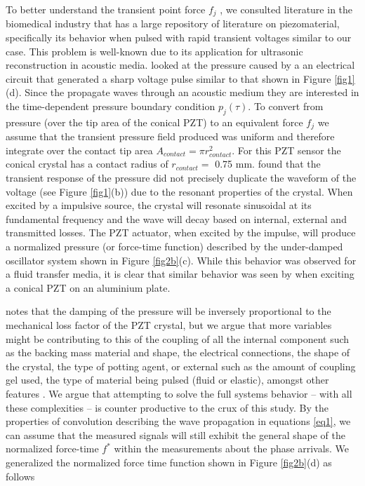 \documentclass[preprint,3p, 11pt,authoryear]{elsarticle}
\begin{document}
To better understand the transient point force $f_{j}$ , we consulted literature in the biomedical industry that has a large repository of literature on piezomaterial, specifically its behavior when pulsed with rapid transient voltages similar to our case. This problem is well-known due to its application for ultrasonic reconstruction in acoustic media.  \citet{Christensen1988} looked at the pressure caused by a an electrical circuit that generated a sharp voltage pulse similar to that shown in Figure \ref{fig1}(d). Since the propagate waves through an acoustic medium they are interested in the time-dependent pressure boundary condition $p_{j}(\tau)$. To convert from pressure (over the tip area of the conical PZT) to an equivalent force $f_{j}$ we assume that the transient pressure field produced was uniform and therefore integrate over the contact tip area $A_{contact} = \pi r_{contact}^{2}$. For this PZT sensor the conical crystal has a contact radius of $r_{contact} = $ 0.75 mm. \cite{Christensen1988} found that the transient response of the pressure did not precisely duplicate the waveform of the voltage (see Figure \ref{fig1}(b)) due to the resonant properties of the crystal. When excited by a impulsive source, the crystal will resonate sinusoidal at its fundamental frequency and the wave will decay based on internal, external and transmitted losses.  The PZT actuator, when excited by the impulse, will produce a normalized pressure (or force-time function) described by the under-damped oscillator system shown in Figure \ref{fig2b}(c). While this behavior was observed for a fluid transfer media, it is clear that similar behavior was seen by\citet{Breckenridge1990} when exciting a conical PZT on an aluminium plate.

\citet{Christensen1988} notes that the damping of the pressure will be inversely proportional to the mechanical loss factor of the PZT crystal, but we argue that more variables might be contributing to this of the coupling of all the internal component such as the backing mass material and shape, the electrical connections, the shape of the crystal, the type of potting agent, or external such as the amount of coupling gel used, the type of material being pulsed (fluid or elastic), amongst other features \citep{Glaser1998}.  We argue that attempting to solve the full systems behavior -- with all these complexities -- is counter productive to the crux of this study. By the properties of convolution describing the wave propagation in equations \eqref{eq1}, we can assume that the measured signals will still exhibit the general shape of the normalized force-time $f^{*}$ within the measurements about the phase arrivals. We generalized the normalized force time function shown in Figure \ref{fig2b}(d) as follows
\end{document}
